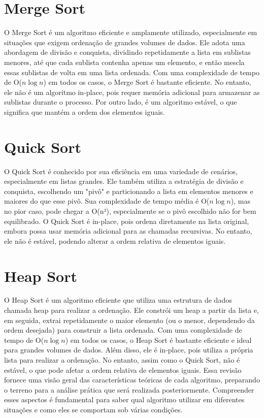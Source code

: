 \documentclass[12pt, a4paper]{report}
\begin{document}
\section{Merge Sort}
O Merge Sort é um algoritmo eficiente e amplamente utilizado, especialmente em
situações que exigem ordenação de grandes volumes de dados. Ele adota uma abordagem de
divisão e conquista, dividindo repetidamente a lista em sublistas menores, até que cada
sublista contenha apenas um elemento, e então mescla essas sublistas de volta em uma lista
ordenada. Com uma complexidade de tempo de O($n \log n$) em todos os casos, o Merge Sort é
bastante eficiente. No entanto, ele não é um algoritmo in-place, pois requer memória
adicional para armazenar as sublistas durante o processo. Por outro lado, é um algoritmo
estável, o que significa que mantém a ordem dos elementos iguais.


\section{Quick Sort}
O Quick Sort é conhecido por sua eficiência em uma variedade de cenários,
especialmente em listas grandes. Ele também utiliza a estratégia de divisão e conquista,
escolhendo um "pivô" e particionando a lista em elementos menores e maiores do que esse
pivô. Sua complexidade de tempo média é O($n \log n$), mas no pior caso, pode chegar a O(n²),
especialmente se o pivô escolhido não for bem equilibrado. O Quick Sort é in-place, pois
ordena diretamente na lista original, embora possa usar memória adicional para as chamadas
recursivas. No entanto, ele não é estável, podendo alterar a ordem relativa de elementos
iguais.

\section{Heap Sort}
O Heap Sort é um algoritmo eficiente que utiliza uma estrutura de dados chamada
heap para realizar a ordenação. Ele constrói um heap a partir da lista e, em seguida, extrai
repetidamente o maior elemento (ou o menor, dependendo da ordem desejada) para construir
a lista ordenada. Com uma complexidade de tempo de O($n \log n$) em todos os casos, o Heap
Sort é bastante eficiente e ideal para grandes volumes de dados. Além disso, ele é in-place,
pois utiliza a própria lista para realizar a ordenação. No entanto, assim como o Quick Sort,
não é estável, o que pode afetar a ordem relativa de elementos iguais.
Essa revisão fornece uma visão geral das características teóricas de cada algoritmo,
preparando o terreno para a análise prática que será realizada posteriormente. Compreender
esses aspectos é fundamental para saber qual algoritmo utilizar em diferentes situações e
como eles se comportam sob várias condições.
\end{document}
